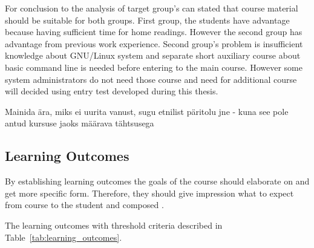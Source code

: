 For conclusion to the analysis of target group's can stated that course material should be suitable for both groups. First group, the students have advantage because having sufficient time for home readings. However the second group has advantage from previous work experience. Second group's problem is insufficient knowledge about GNU/Linux system and separate short auxiliary course about basic command line is needed before entering to the main course. However some system administrators do not need those course and need for additional course will decided using entry test developed during this thesis.

{\color{red} Mainida ära, miks ei uurita vanust, sugu etnilist päritolu jne - kuna see pole antud kursuse jaoks määrava tähtsusega }

\subsection{Learning Outcomes}

By establishing learning outcomes the goals of the course should elaborate on and get more specific form. Therefore, they should give impression what to expect from course to the student and composed  \citep[p.~7]{OppeArenduskeskus2010}.

The learning outcomes with threshold criteria described in Table~\ref{tab:learning_outcomes}.


